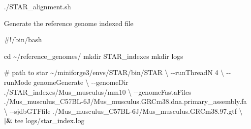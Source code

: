 \documentclass[
  letterpaper,
  DIV=11,
  numbers=noendperiod]{scrreprt}
\newenvironment{Shaded}{\begin{snugshade}}{\end{snugshade}}
\newcommand{\AttributeTok}[1]{\textcolor[rgb]{0.40,0.45,0.13}{#1}}
\newcommand{\BuiltInTok}[1]{\textcolor[rgb]{0.00,0.23,0.31}{#1}}
\newcommand{\CommentTok}[1]{\textcolor[rgb]{0.37,0.37,0.37}{#1}}
\newcommand{\ControlFlowTok}[1]{\textcolor[rgb]{0.00,0.23,0.31}{\textbf{#1}}}
\newcommand{\DataTypeTok}[1]{\textcolor[rgb]{0.68,0.00,0.00}{#1}}
\newcommand{\ExtensionTok}[1]{\textcolor[rgb]{0.00,0.23,0.31}{#1}}
\newcommand{\FunctionTok}[1]{\textcolor[rgb]{0.28,0.35,0.67}{#1}}
\newcommand{\KeywordTok}[1]{\textcolor[rgb]{0.00,0.23,0.31}{\textbf{#1}}}
\newcommand{\NormalTok}[1]{\textcolor[rgb]{0.00,0.23,0.31}{#1}}
\newcommand{\PreprocessorTok}[1]{\textcolor[rgb]{0.68,0.00,0.00}{#1}}
\newcommand{\StringTok}[1]{\textcolor[rgb]{0.13,0.47,0.30}{#1}}
\newcommand{\VariableTok}[1]{\textcolor[rgb]{0.07,0.07,0.07}{#1}}
\begin{document}
\begin{Shaded}
\end{Shaded}

\begin{Shaded}
\begin{Highlighting}[]
\ExtensionTok{./STAR\_alignment.sh}
\end{Highlighting}
\end{Shaded}

Generate the reference genome indexed file

\begin{Shaded}
\begin{Highlighting}[]
\CommentTok{\#!/bin/bash}

\BuiltInTok{cd}\NormalTok{ \textasciitilde{}/reference\_genomes/}
\FunctionTok{mkdir}\NormalTok{ STAR\_indexes}
\FunctionTok{mkdir}\NormalTok{ logs}

\CommentTok{\# path to star}
\ExtensionTok{\textasciitilde{}/miniforge3/envs/STAR/bin/STAR} \DataTypeTok{\textbackslash{}}
            \AttributeTok{{-}{-}runThreadN}\NormalTok{ 4 }\DataTypeTok{\textbackslash{}}
        \AttributeTok{{-}{-}runMode}\NormalTok{ genomeGenerate }\DataTypeTok{\textbackslash{}}
        \AttributeTok{{-}{-}genomeDir}\NormalTok{ ./STAR\_indexes/Mus\_musculus/mm10 }\DataTypeTok{\textbackslash{}}
        \AttributeTok{{-}{-}genomeFastaFiles}\NormalTok{ ./Mus\_musculus\_C57BL{-}6J/Mus\_musculus.GRCm38.dna.primary\_assembly.fa }\DataTypeTok{\textbackslash{}}
        \AttributeTok{{-}{-}sjdbGTFfile}\NormalTok{ ./Mus\_musculus\_C57BL{-}6J/Mus\_musculus.GRCm38.97.gtf }\DataTypeTok{\textbackslash{}}
                                \KeywordTok{|\&} \FunctionTok{tee}\NormalTok{ logs/star\_index.log}
\end{Highlighting}
\end{Shaded}
\end{document}
